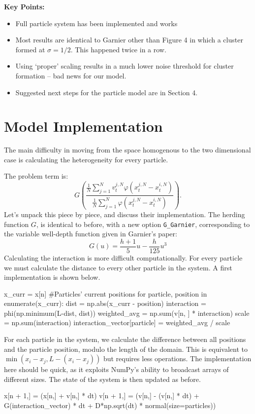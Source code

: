 \documentclass[11pt,a4paper, final, dvipsnames]{article}
\begin{document}
    {\large \textbf{Key Points:}}
    \begin{itemize}
        \item Full particle system has been implemented and works
        \item Most results are identical to Garnier other than Figure 4 in which a cluster formed at $\sigma = 1/2$. This happened twice in a row.
        \item Using `proper' scaling results in a much lower noise threshold for cluster formation -- bad news for our model. 
        \item Suggested next steps for the particle model are in Section 4.
    \end{itemize}
    \section{Model Implementation}
        The main difficulty in moving from the space homogenous to the two dimensional case is calculating the heterogeneity for every particle.
        
        The problem term is:
        \begin{equation}\label{interaction}
            G\left(\frac{\frac{1}{N}\sum_{j=1}^N v_t^{j,N}\varphi(x^{j,N}_t-x^{i,N}_t)}{\frac{1}{N}\sum_{j=1}^N \varphi(x^{j,N}_t-x^{i,N}_t)}\right).
        \end{equation}
        Let's unpack this piece by piece, and discuss their implementation. The herding function $G$, is identical to before, with a new option \texttt{G\_Garnier}, corresponding to the variable well-depth function given in Garnier's paper:
        $$G(u) = \frac{h+1}{5}u - \frac{h}{125} u^3$$
        Calculating the interaction is more difficult computationally. For every particle we must calculate the distance to every other particle in the system. A first implementation is shown below.

        \begin{python}
x_curr = x[n] #Particles' current positions
   for particle, position in enumerate(x_curr):
       dist = np.abs(x_curr - position)
       interaction = phi(np.minimum(L-dist, dist))
       weighted_avg = np.sum(v[n, ] * interaction)
       scale = np.sum(interaction)
       interaction_vector[particle] = weighted_avg / scale
        \end{python}
        For each particle in the system, we calculate the difference between all positions and the particle position, modulo the length of the domain. This is equivalent to $\min(x_i-x_j, L-(x_i-x_j))$ but requires less operations. The implementation here should be quick, as it exploits NumPy's ability to broadcast arrays of different sizes. The state of the system is then updated as before.
        \begin{python}
x[n + 1,] = (x[n,] + v[n,] * dt) %
v[n + 1,] = (v[n,] - (v[n,] * dt) + G(interaction_vector) * dt
            + D*np.sqrt(dt) * normal(size=particles))
        \end{python}
        
\end{document}

